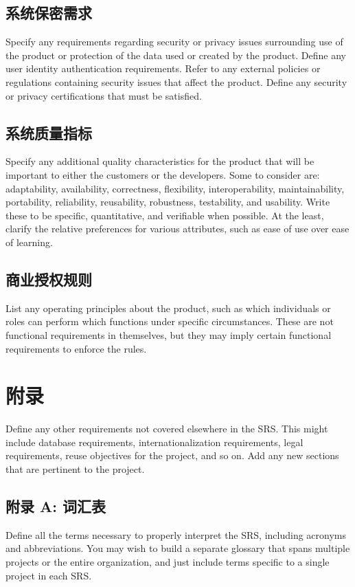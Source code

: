 \documentclass{ctexart}
\begin{document}
\subsection{系统保密需求}
Specify any requirements regarding security or privacy issues surrounding use 
of the product or protection of the data used or created by the product. Define 
any user identity authentication requirements. Refer to any external policies or 
regulations containing security issues that affect the product. Define any 
security or privacy certifications that must be satisfied.


\subsection{系统质量指标}
Specify any additional quality characteristics for the product that will be 
important to either the customers or the developers. Some to consider are: 
adaptability, availability, correctness, flexibility, interoperability, 
maintainability, portability, reliability, reusability, robustness, testability, 
and usability. Write these to be specific, quantitative, and verifiable when 
possible. At the least, clarify the relative preferences for various attributes, 
such as ease of use over ease of learning.


\subsection{商业授权规则}
List any operating principles about the product, such as which individuals or 
roles can perform which functions under specific circumstances. These are not 
functional requirements in themselves, but they may imply certain functional 
requirements to enforce the rules.



\section{附录}
Define any other requirements not covered elsewhere in the SRS. This might 
include database requirements, internationalization requirements, legal 
requirements, reuse objectives for the project, and so on. Add any new sections 
that are pertinent to the project.
\subsection{附录 A: 词汇表}
Define all the terms necessary to properly interpret the SRS, including 
acronyms and abbreviations. You may wish to build a separate glossary that spans 
multiple projects or the entire organization, and just include terms specific to 
a single project in each SRS.
\end{document}
